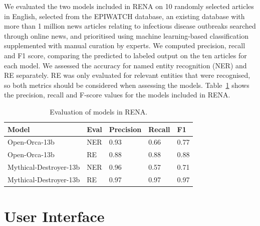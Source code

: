 \documentclass[letterpaper]{article} %
\begin{document}
We evaluated the two models included in RENA on 10 randomly selected articles in English, selected from the EPIWATCH database, an existing database with more than 1 million news articles relating to infectious disease outbreaks searched through online news, and prioritised using machine learning-based classification supplemented with manual curation by experts. We computed precision, recall and F1 score, comparing the predicted to labeled output on the ten articles for each model. We assessed the accuracy for named entity recognition (NER) and RE separately. RE was only evaluated for relevant entities that were recognised, so both metrics should be considered when assessing the models. Table~\ref{tab1} shows the precision, recall and F-score values for the models included in RENA.



\begin{table}[]
\begin{tabular}{lllll}
\toprule
 Model  & Eval & Precision &  Recall  &  F1  \\ \midrule
 Open-Orca-13b &  NER & 0.93 & 0.66 & 0.77 \\
 Open-Orca-13b  & RE  & 0.88 & 0.88 & 0.88 \\
 Mythical-Destroyer-13b  & NER & 0.96  & 0.57 & 0.71 \\
 Mythical-Destroyer-13b & RE & 0.97 & 0.97 & 0.97 \\ \bottomrule
\end{tabular}
\caption{Evaluation of models in RENA.}
\label{tab1}
\end{table} 


\section{User Interface}
\end{document}
